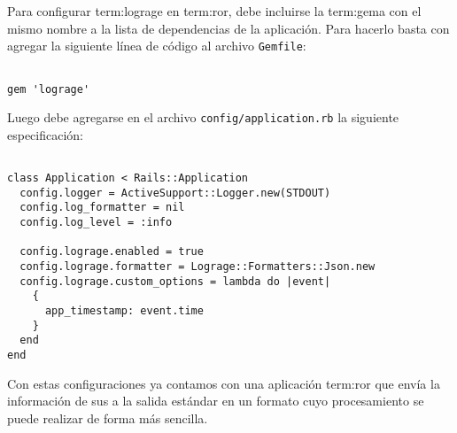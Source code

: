 Para configurar \gls{term:lograge} en \gls{term:ror}, debe incluirse la \gls{term:gema} con
el mismo nombre a la lista de dependencias de la aplicación. Para hacerlo basta
con agregar la siguiente línea de código al archivo \texttt{Gemfile}:

\begin{lstlisting}

gem 'lograge'

\end{lstlisting}

Luego debe agregarse en el archivo \texttt{config/application.rb} la siguiente
especificación:

\begin{lstlisting}

class Application < Rails::Application
  config.logger = ActiveSupport::Logger.new(STDOUT)
  config.log_formatter = nil
  config.log_level = :info

  config.lograge.enabled = true
  config.lograge.formatter = Lograge::Formatters::Json.new
  config.lograge.custom_options = lambda do |event|
    {
      app_timestamp: event.time
    }
  end
end

\end{lstlisting}

Con estas configuraciones ya contamos con una aplicación \gls{term:ror} que
envía la información de sus  a la salida estándar en un formato cuyo
procesamiento se puede realizar de forma más sencilla.
